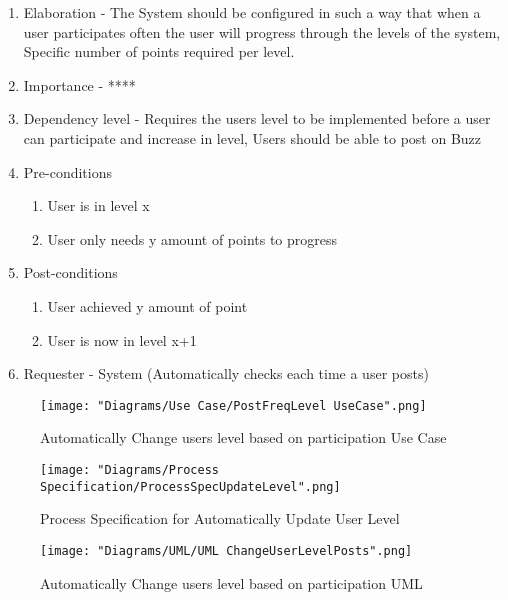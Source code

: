 \documentclass[12pt]{article}
\begin{document}
\begin{enumerate}
\begin{enumerate}
    \item Elaboration - The System should be configured in such a way that when a user participates often the user will progress through the levels of the system, Specific number of points required per level.
    \item Importance - ****
    \item Dependency level - Requires the users level to be implemented before a user can participate and increase in level, Users should be able to post on Buzz
    \item Pre-conditions
    \begin{enumerate}
    	\item User is in level x
    	\item User only needs y amount of points to progress
    \end{enumerate}
        \item Post-conditions
    \begin{enumerate}
    	\item User achieved y amount of point
    	\item User is now in level x+1
    \end{enumerate}
    \item Requester - System (Automatically checks each time a user posts)
  \end{enumerate}
\begin{figure}[h]
	\centering
	\texttt{[image: "Diagrams/Use Case/PostFreqLevel UseCase".png]}
	\caption{Automatically Change users level based on participation Use Case}
\end{figure}
\begin{figure}[h]
	\centering
	\texttt{[image: "Diagrams/Process Specification/ProcessSpecUpdateLevel".png]}
	\caption{Process Specification for Automatically Update User Level}
\end{figure} 
\begin{figure}[h]
	\centering
	\texttt{[image: "Diagrams/UML/UML ChangeUserLevelPosts".png]}
	\caption{Automatically Change users level based on participation UML}
\end{figure}
\clearpage %


\end{enumerate}
\end{document}
